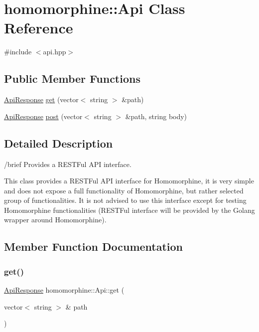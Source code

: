\hypertarget{classhomomorphine_1_1_api}{}\section{homomorphine\+::Api Class Reference}
\label{classhomomorphine_1_1_api}


{\ttfamily \#include $<$api.\+hpp$>$}

\subsection*{Public Member Functions}
\begin{DoxyCompactItemize}
\item 
\mbox{\hyperlink{classhomomorphine_1_1_api_response}{Api\+Response}} \mbox{\hyperlink{classhomomorphine_1_1_api_aa595d352d3494870f5e5bd7262be90c2}{get}} (vector$<$ string $>$ \&path)
\item 
\mbox{\hyperlink{classhomomorphine_1_1_api_response}{Api\+Response}} \mbox{\hyperlink{classhomomorphine_1_1_api_ab538a352f9ef7e92885bdd25a2f3dedd}{post}} (vector$<$ string $>$ \&path, string body)
\end{DoxyCompactItemize}


\subsection{Detailed Description}
/brief Provides a R\+E\+S\+T\+Ful A\+PI interface.

This class provides a R\+E\+S\+T\+Ful A\+PI interface for Homomorphine, it is very simple and does not expose a full functionality of Homomorphine, but rather selected group of functionalities. It is not advised to use this interface except for testing Homomorphine functionalities (R\+E\+S\+T\+Ful interface will be provided by the Golang wrapper around Homomorphine). 

\subsection{Member Function Documentation}
\mbox{\label{classhomomorphine_1_1_api_aa595d352d3494870f5e5bd7262be90c2}} 
\subsubsection{\texorpdfstring{get()}{get()}}
{\footnotesize\ttfamily \mbox{\hyperlink{classhomomorphine_1_1_api_response}{Api\+Response}} homomorphine\+::\+Api\+::get (\begin{DoxyParamCaption}\item[{vector$<$ string $>$ \&}]{path }\end{DoxyParamCaption})}

